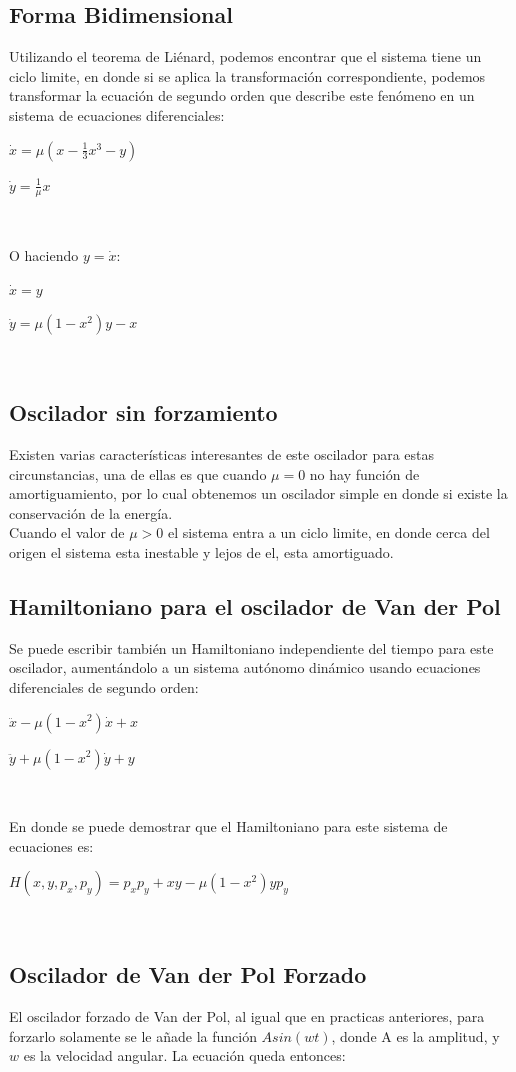 \documentclass[12pt]{article}
\begin{document}
\subsection{Forma Bidimensional}
Utilizando el teorema de Liénard, podemos encontrar que el sistema tiene un ciclo limite, en donde si se aplica la transformación correspondiente, podemos transformar la ecuación de segundo orden que describe este fenómeno en un sistema de ecuaciones diferenciales: \\ 

\centerline{$ \dot x = \mu(x - \frac{1}{3}x^3-y)$}
\centerline{$ \dot y = \frac{1}{\mu}x$}
$    $

O haciendo $ y= \dot x$:

\centerline{$ \dot x = y$}
\centerline{$ \dot y = \mu (1-x^2)y - x$}
$    $

\subsection{Oscilador sin forzamiento}
Existen varias características interesantes de este oscilador para estas circunstancias, una de ellas es que cuando $\mu = 0$ no hay función de amortiguamiento, por lo cual obtenemos un oscilador simple en donde si existe la conservación de la energía. \\

Cuando el valor de $\mu > 0$ el sistema entra a un ciclo limite, en donde cerca del origen el sistema esta inestable y lejos de el, esta amortiguado. \\

\subsection{Hamiltoniano para el oscilador de Van der Pol}
Se puede escribir también un Hamiltoniano independiente del tiempo para este oscilador, aumentándolo a un sistema autónomo dinámico usando ecuaciones diferenciales de segundo orden: \\

\centerline{$ \ddot x - \mu (1-x^2) \dot x + x$}
\centerline{$ \ddot y + \mu (1-x^2) \dot y + y$}
$    $

En donde se puede demostrar que el Hamiltoniano para este sistema de ecuaciones es:

\centerline{$ H(x,y,p_x,p_y) = p_x p_y +xy -\mu (1-x^2)yp_y$}
$    $

\subsection{Oscilador de Van der Pol Forzado}
El oscilador forzado de Van der Pol, al igual que en practicas anteriores, para forzarlo solamente se le añade la función $Asin(wt)$, donde A es la amplitud, y $w$ es la velocidad angular. La ecuación queda entonces: \\
\end{document}
